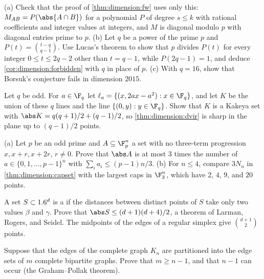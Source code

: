 \begin{refsection}
\begin{exercises}
\item \consolidation\hard (a) Check that the proof of \cref{thm:dimension:fw} uses only this: $M_{AB}=P(\abs{A\cap B})$ for a polynomial $P$ of degree $s\le k$ with rational coefficients and integer values at integers, and $M$ is diagonal modulo $p$ with diagonal entries prime to $p$. (b) Let $q$ be a power of the prime $p$ and $P(t)=\binom{t-q}{q-1}$. Use Lucas's theorem to show that $p$ divides $P(t)$ for every integer $0\le t\le2q-2$ other than $t=q-1$, while $P(2q-1)=1$, and deduce \cref{cor:dimension:forbidden} with $q$ in place of $p$. (c) With $q=16$, show that Borsuk's conjecture fails in dimension $2015$. \label{ex:dimension:primepower}

\item \consolidation Let $q$ be odd. For $a\in\F_q$ let $\ell_a=\{(x,2ax-a^2):x\in\F_q\}$, and let $K$ be the union of these $q$ lines and the line $\{(0,y):y\in\F_q\}$. Show that $K$ is a Kakeya set with $\abs K=q(q+1)/2+(q-1)/2$, so \cref{thm:dimension:dvir} is sharp in the plane up to $(q-1)/2$ points. \label{ex:dimension:plane}

\item \consolidation\hard (a) Let $p$ be an odd prime and $A\subseteq\F_p^n$ a set with no three-term progression $x,x+r,x+2r$, $r\ne0$. Prove that $\abs A$ is at most $3$ times the number of $a\in\{0,1,\dots,p-1\}^n$ with $\sum_ia_i\le(p-1)n/3$. (b) For $n\le4$, compare $3N_n$ in \cref{thm:dimension:capset} with the largest caps in $\F_3^n$, which have $2$, $4$, $9$, and $20$ points. \label{ex:dimension:smallcaps}

\item \transfer\hard A set $S\subset1.6^d$ is a  if the distances between distinct points of $S$ take only two values $\beta$ and $\gamma$. Prove that $\abs S\le(d+1)(d+4)/2$, a theorem of Larman, Rogers, and Seidel.  The midpoints of the edges of a regular simplex give $\binom{d+1}{2}$ points.\label{ex:dimension:twodistance}

\item \transfer Suppose that the edges of the complete graph $K_n$ are partitioned into the edge sets of $m$ complete bipartite graphs. Prove that $m\ge n-1$, and that $n-1$ can occur (the Graham--Pollak theorem). \label{ex:dimension:gp}


\end{exercises}
\end{refsection}
